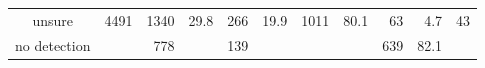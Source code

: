 \begin{tiny}
\begin{table}[h]
\begin{tabular}{crrrrrrrrrl}
unsure               & 4491                                                                                  & 1340                                                             & 29.8                                                                                                               & 266                                                                                    & 19.9                                     & 1011                                                                                   & 80.1                                     & 63                                                                                     & 4.7                                      & \multicolumn{1}{r}{43}                                                                 \\
no detection         & \multicolumn{1}{l}{}                                                                  & 778                                                              & \multicolumn{1}{l}{}                                                                                               & 139                                                                                    & \multicolumn{1}{l}{}                     & \multicolumn{1}{l}{}                                                                   & \multicolumn{1}{l}{}                     & 639                                                                                    & 82.1                                     &                                                                                       
\end{tabular}
\end{table}
\end{tiny}